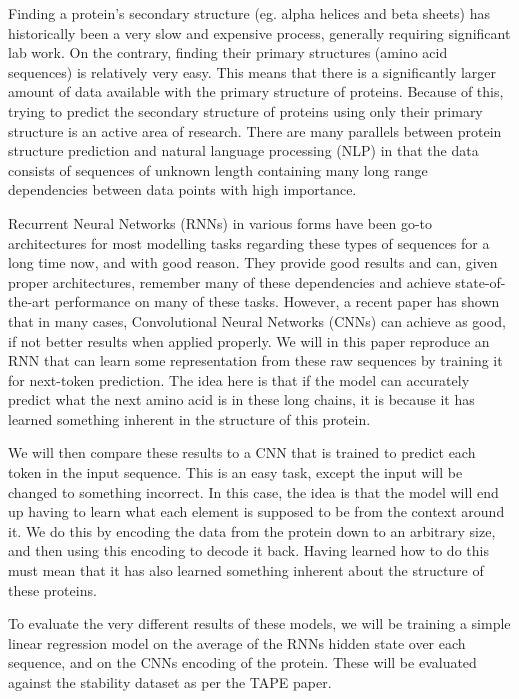 %
Finding a protein's secondary structure (eg. alpha helices and beta sheets) has historically been a very slow and expensive process, generally requiring significant lab work. On the contrary, finding their primary structures (amino acid sequences) is relatively very easy. This means that there is a significantly larger amount of data available with the primary structure of proteins. Because of this, trying to predict the secondary structure of proteins using only their primary structure is an active area of research. There are many parallels between protein structure prediction and natural language processing (NLP) in that the data consists of sequences of unknown length containing many long range dependencies between data points with high importance. 

Recurrent Neural Networks (RNNs) in various forms have been go-to architectures for most modelling tasks regarding these types of sequences for a long time now, and with good reason. They provide good results and can, given proper architectures, remember many of these dependencies and achieve state-of-the-art performance on many of these tasks. However, a recent paper has shown that in many cases, Convolutional Neural Networks (CNNs) can achieve as good, if not better results when applied properly.\cite{intro} We will in this paper reproduce an RNN that can learn some representation from these raw sequences by training it for next-token prediction.\cite{unirep} The idea here is that if the model can accurately predict what the next amino acid is in these long chains, it is because it has learned something inherent in the structure of this protein.

We will then compare these results to a CNN that is trained to predict each token in the input sequence. This is an easy task, except the input will be changed to something incorrect. In this case, the idea is that the model will end up having to learn what each element is supposed to be from the context around it. We do this by encoding the data from the protein down to an arbitrary size, and then using this encoding to decode it back. Having learned how to do this must mean that it has also learned something inherent about the structure of these proteins. 

To evaluate the very different results of these models, we will be training a simple linear regression model on the average of the RNNs hidden state over each sequence, and on the CNNs encoding of the protein. These will be evaluated against the stability dataset\cite{stability} as per the TAPE paper.\cite{tape}